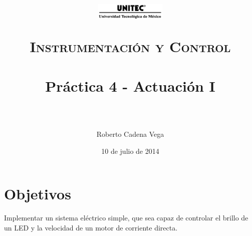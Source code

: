 



\title{
	\normalfont \normalsize
	\begin{figure}[h]
		\centering \includegraphics[width=0.3\textwidth]{../images/UNITEC.png}
	\end{figure}
	\textsc{Instrumentación y Control} \\ [25pt]
	\horrule{0.5pt} \\[0.4cm] %
	\huge Práctica 4 - Actuación I \\ %
	\horrule{2pt} \\[0.5cm] %
}

\author{Roberto Cadena Vega} %

\date{\normalsize 10 de julio de 2014} %




\maketitle %


\section{Objetivos}

	Implementar un sistema eléctrico simple, que sea capaz de controlar el brillo de un LED y la velocidad de un motor de corriente directa.

